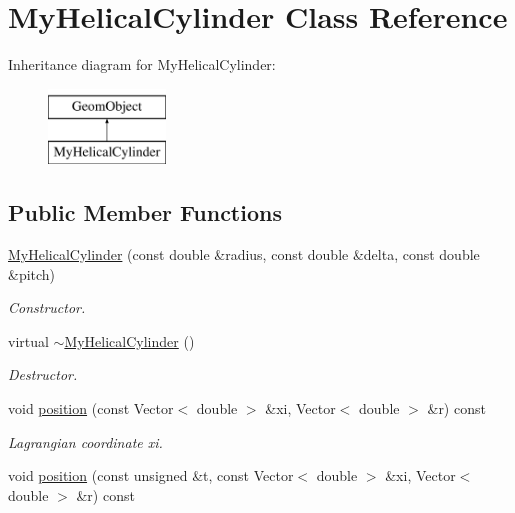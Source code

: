 \hypertarget{classMyHelicalCylinder}{}\section{My\+Helical\+Cylinder Class Reference}
\label{classMyHelicalCylinder}
Inheritance diagram for My\+Helical\+Cylinder\+:\begin{figure}[H]
\begin{center}
\leavevmode
\includegraphics[height=2.000000cm]{classMyHelicalCylinder}
\end{center}
\end{figure}
\subsection*{Public Member Functions}
\begin{DoxyCompactItemize}
\item 
\hyperlink{classMyHelicalCylinder_a2ed054a7b461d0dabd5c35a59f7aefb3}{My\+Helical\+Cylinder} (const double \&radius, const double \&delta, const double \&pitch)
\begin{DoxyCompactList}\small\item\em Constructor. \end{DoxyCompactList}\item 
virtual \hyperlink{classMyHelicalCylinder_aa93f7a69d2fabd3fedb804ab4ba65946}{$\sim$\+My\+Helical\+Cylinder} ()
\begin{DoxyCompactList}\small\item\em Destructor. \end{DoxyCompactList}\item 
void \hyperlink{classMyHelicalCylinder_aaf3a0e41ba30cd66d049a3fcb8eb1213}{position} (const Vector$<$ double $>$ \&xi, Vector$<$ double $>$ \&r) const
\begin{DoxyCompactList}\small\item\em Lagrangian coordinate xi. \end{DoxyCompactList}\item 
void \hyperlink{classMyHelicalCylinder_ae35db6b394ce561acfda83a61b678ff5}{position} (const unsigned \&t, const Vector$<$ double $>$ \&xi, Vector$<$ double $>$ \&r) const
\end{DoxyCompactItemize}
